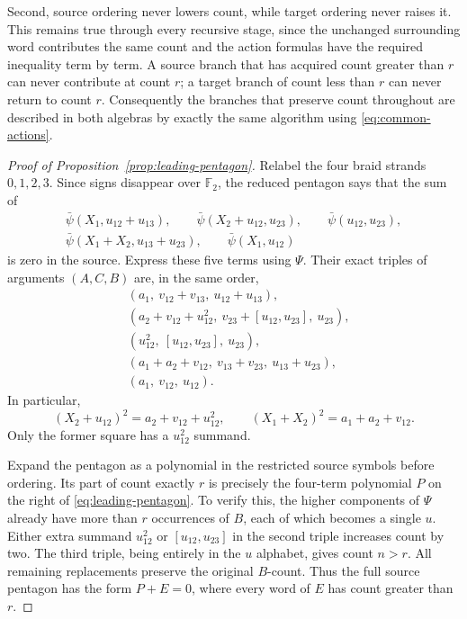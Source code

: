 \documentclass[11pt]{article}
\theoremstyle{definition}
\theoremstyle{remark}
\numberwithin{equation}{section}
\begin{document}
Second, source ordering never lowers count, while target ordering
never raises it.  This remains true through every recursive stage,
since the unchanged surrounding word contributes the same count
and the action formulas have the required inequality term by term.
A source branch that has acquired count greater than $r$ can never
contribute at count $r$; a target branch of count less than $r$ can
never return to count $r$.  Consequently the branches that preserve
count throughout are described in both algebras by exactly the same
algorithm using \eqref{eq:common-actions}.

\begin{proof}[Proof of Proposition~\ref{prop:leading-pentagon}]
Relabel the four braid strands $0,1,2,3$.  Since signs disappear over
${\mathbb F_2}$, the reduced pentagon says that the sum of
\[
 \begin{gathered}
 \bar\psi(X_1,u_{12}+u_{13}),\qquad
 \bar\psi(X_2+u_{12},u_{23}),\qquad
 \bar\psi(u_{12},u_{23}),\\
 \bar\psi(X_1+X_2,u_{13}+u_{23}),\qquad
 \bar\psi(X_1,u_{12})
 \end{gathered}
\]
is zero in the source.  Express these five terms using $\Psi$.
Their exact triples of arguments $(A,C,B)$ are, in the same order,
\begin{equation}\label{eq:five-substitutions}
\begin{aligned}
 &(a_1,\ v_{12}+v_{13},\ u_{12}+u_{13}),\\
 &(a_2+v_{12}+u_{12}^2,\ v_{23}+[u_{12},u_{23}],\ u_{23}),\\
 &(u_{12}^2,\ [u_{12},u_{23}],\ u_{23}),\\
 &(a_1+a_2+v_{12},\ v_{13}+v_{23},\ u_{13}+u_{23}),\\
 &(a_1,\ v_{12},\ u_{12}).
\end{aligned}
\end{equation}
In particular,
\[
 (X_2+u_{12})^2=a_2+v_{12}+u_{12}^2,
 \qquad (X_1+X_2)^2=a_1+a_2+v_{12}.
\]
Only the former square has a $u_{12}^2$ summand.

Expand the pentagon as a polynomial in the restricted source symbols
before ordering.  Its part of count exactly $r$ is precisely the
four-term polynomial $P$ on the right of
\eqref{eq:leading-pentagon}.  To verify this, the higher components
of $\Psi$ already have more than $r$ occurrences of $B$, each of
which becomes a single $u$.  Either extra summand $u_{12}^2$ or
$[u_{12},u_{23}]$ in the second triple increases count by two.
The third triple, being entirely in the $u$ alphabet, gives count
$n>r$.  All remaining replacements preserve the original $B$-count.
Thus the full source pentagon has the form $P+E=0$, where every word
of $E$ has count greater than $r$.


\end{proof}
\end{document}
